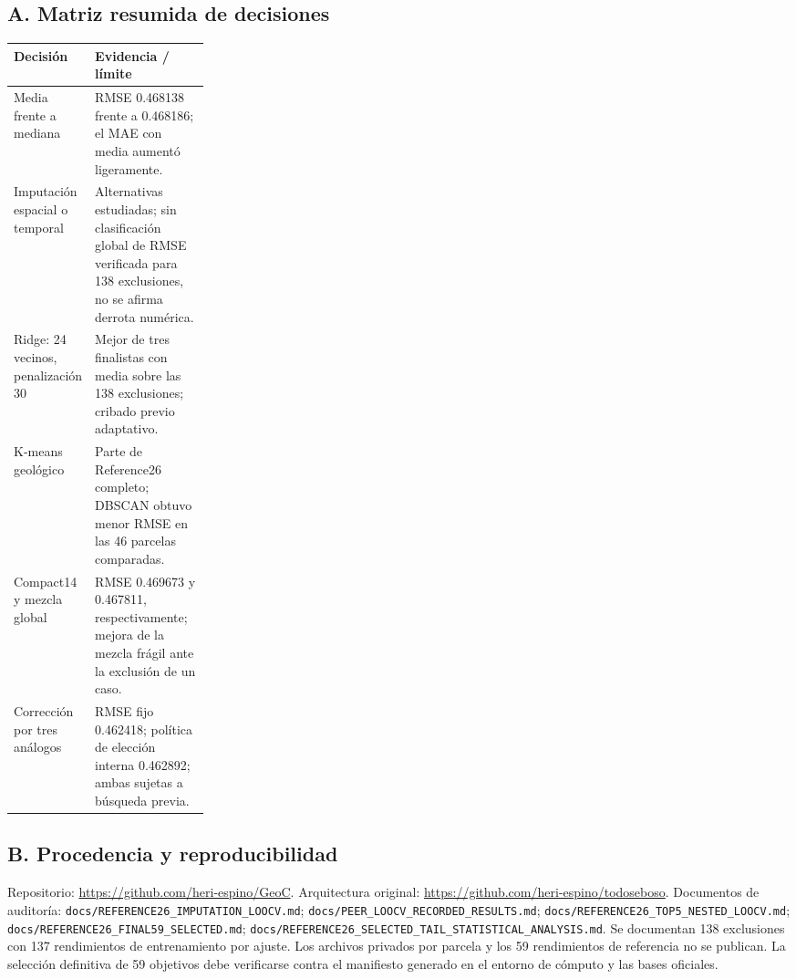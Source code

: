 \small
\subsection*{A. Matriz resumida de decisiones}
\begin{tabularx}{\linewidth}{@{}p{0.25\linewidth}X@{}}
\toprule
Decisión & Evidencia / límite\\
\midrule
Media frente a mediana & RMSE 0.468138 frente a 0.468186; el MAE con media aumentó ligeramente.\\
Imputación espacial o temporal & Alternativas estudiadas; sin clasificación global de RMSE verificada para 138 exclusiones, no se afirma derrota numérica.\\
Ridge: 24 vecinos, penalización 30 & Mejor de tres finalistas con media sobre las 138 exclusiones; cribado previo adaptativo.\\
K-means geológico & Parte de Reference26 completo; DBSCAN obtuvo menor RMSE en las 46 parcelas comparadas.\\
Compact14 y mezcla global & RMSE 0.469673 y 0.467811, respectivamente; mejora de la mezcla frágil ante la exclusión de un caso.\\
Corrección por tres análogos & RMSE fijo 0.462418; política de elección interna 0.462892; ambas sujetas a búsqueda previa.\\
\bottomrule
\end{tabularx}
\subsection*{B. Procedencia y reproducibilidad}
Repositorio: \url{https://github.com/heri-espino/GeoC}. Arquitectura original: \url{https://github.com/heri-espino/todoseboso}. Documentos de auditoría: \texttt{docs/REFERENCE26\_IMPUTATION\_LOOCV.md}; \texttt{docs/PEER\_LOOCV\_RECORDED\_RESULTS.md}; \texttt{docs/REFERENCE26\_TOP5\_NESTED\_LOOCV.md}; \texttt{docs/REFERENCE26\_FINAL59\_SELECTED.md}; \texttt{docs/REFERENCE26\_SELECTED\_TAIL\_STATISTICAL\_ANALYSIS.md}. Se documentan 138 exclusiones con 137 rendimientos de entrenamiento por ajuste. Los archivos privados por parcela y los 59 rendimientos de referencia no se publican. La selección definitiva de 59 objetivos debe verificarse contra el manifiesto generado en el entorno de cómputo y las bases oficiales.
\normalsize
